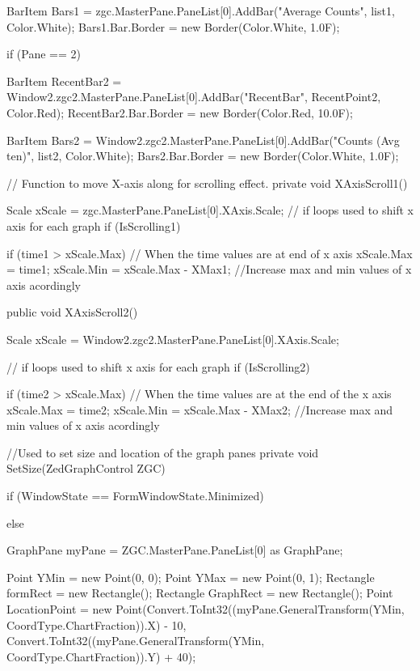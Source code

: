 {{{{                BarItem Bars1 = zgc.MasterPane.PaneList[0].AddBar("Average Counts", list1, Color.White);
                Bars1.Bar.Border = new Border(Color.White, 1.0F);
            }

            if (Pane == 2)
            {
                BarItem RecentBar2 = Window2.zgc2.MasterPane.PaneList[0].AddBar("RecentBar", RecentPoint2, Color.Red);
                RecentBar2.Bar.Border = new Border(Color.Red, 10.0F);

                BarItem Bars2 = Window2.zgc2.MasterPane.PaneList[0].AddBar("Counts (Avg ten)", list2, Color.White);
                Bars2.Bar.Border = new Border(Color.White, 1.0F);
            }

        }

        // Function to move X-axis along for scrolling effect.
        private void XAxisScroll1()
        {

            Scale xScale = zgc.MasterPane.PaneList[0].XAxis.Scale;
            // if loops used to shift x axis for each graph
            if (IsScrolling1)
            {
                if (time1 > xScale.Max) // When the time values are at end of x axis
                {
                    xScale.Max = time1; 
                    xScale.Min = xScale.Max - XMax1;   //Increase max and min values of x axis acordingly
                }

            }
        }

        public void XAxisScroll2()
        {

            Scale xScale = Window2.zgc2.MasterPane.PaneList[0].XAxis.Scale;


            // if loops used to shift x axis for each graph
            if (IsScrolling2)
            {
                if (time2 > xScale.Max) // When the time values are at the end of the x axis
                {
                    xScale.Max = time2; 
                    xScale.Min = xScale.Max - XMax2;   //Increase max and min values of x axis acordingly
                }

            }
        }

        //Used to set size and location of the graph panes
        private void SetSize(ZedGraphControl ZGC)
        {
            if (WindowState == FormWindowState.Minimized)
            {

            }
            else
            {
                GraphPane myPane = ZGC.MasterPane.PaneList[0] as GraphPane;

                Point YMin = new Point(0, 0);
                Point YMax = new Point(0, 1);
                Rectangle formRect = new Rectangle();
                Rectangle GraphRect = new Rectangle();
                Point LocationPoint = new Point(Convert.ToInt32((myPane.GeneralTransform(YMin, CoordType.ChartFraction)).X) - 10, Convert.ToInt32((myPane.GeneralTransform(YMin, CoordType.ChartFraction)).Y) + 40);

}}}}
